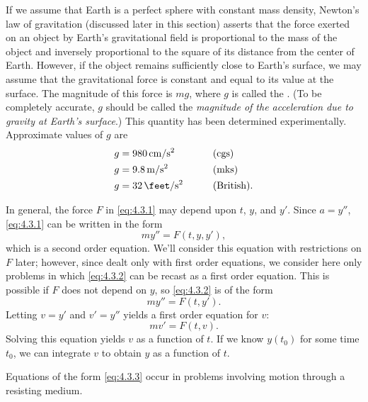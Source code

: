 If we assume that Earth is a perfect sphere with constant mass
density,  Newton's law of
gravitation
(discussed later in this section)
asserts that the force exerted on an object by Earth's
gravitational field is proportional to the mass of the object and
inversely proportional to the square of its  distance from the
center of Earth. However, if the object remains sufficiently close to
Earth's surface, we may assume that the gravitational force is
constant and equal to its value at the surface. The magnitude of this
force is $mg$, where $g$ is called the . (To be completely accurate, $g$ should be called the
\emph{\color{blue}magnitude of the acceleration due to gravity at Earth's surface}.)
This quantity has been determined experimentally. Approximate
values of $g$  are
\begin{alignat*}{2}
g &=\qty{980}{\centi\meter\per\second\squared}&&\text{(cgs)}   \\
g &=\qty{9.8}{\meter\per\second\squared}&\qquad&\text{(mks)}   \\
g &=\qty{32}{\feet\per\second\squared}&&\text{(British)}.
\end{alignat*}

In general, the force $F$ in \eqref{eq:4.3.1} may depend upon $t$, $y$, and
$y'$. Since $a=y''$,  \eqref{eq:4.3.1} can be written in the
form
\begin{equation} \label{eq:4.3.2}
my''=F(t,y,y'),
\end{equation}
which is a second order equation. We'll consider this equation with
restrictions on $F$ later; however, since 
dealt only with first order equations, we consider here only problems in
which \eqref{eq:4.3.2} can be recast as a first order equation. This is
possible if $F$ does not depend on $y$, so \eqref{eq:4.3.2} is of the form
\[
my''=F(t,y').
\]
 Letting $v=y'$ and $v'=y''$ yields a first order
equation for $v$:
\begin{equation} \label{eq:4.3.3}
mv'=F(t,v).
\end{equation}
Solving this equation yields $v$ as a function of $t$. If we know
$y(t_0)$ for some time $t_0$, we can  integrate $v$ to obtain $y$
as a function of $t$.

Equations of the form \eqref{eq:4.3.3} occur in problems involving motion
through a resisting medium.



